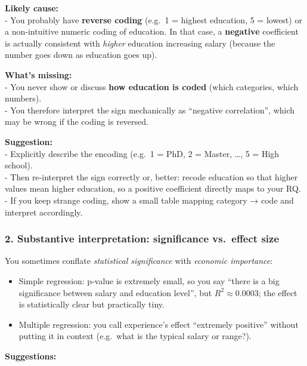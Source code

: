 \documentclass[
  letterpaper,
  DIV=11,
  numbers=noendperiod]{scrartcl}
\providecommand{\tightlist}{%
  \setlength{\itemsep}{0pt}\setlength{\parskip}{0pt}}
\begin{document}
\textbf{Likely cause:}\\
- You probably have \textbf{reverse coding} (e.g.~1 = highest education,
5 = lowest) or a non‑intuitive numeric coding of education. In that
case, a \textbf{negative} coefficient is actually consistent with
\emph{higher} education increasing salary (because the number goes down
as education goes up).

\textbf{What's missing:}\\
- You never show or discuss \textbf{how education is coded} (which
categories, which numbers).\\
- You therefore interpret the sign mechanically as ``negative
correlation'', which may be wrong if the coding is reversed.

\textbf{Suggestion:}\\
- Explicitly describe the encoding (e.g.~1 = PhD, 2 = Master, \ldots, 5
= High school).\\
- Then re-interpret the sign correctly or, better: recode education so
that higher values mean higher education, so a positive coefficient
directly maps to your RQ.\\
- If you keep strange coding, show a small table mapping category → code
and interpret accordingly.

\subsubsection{2. Substantive interpretation: significance vs.~effect
size}\label{substantive-interpretation-significance-vs.-effect-size}

You sometimes conflate \emph{statistical significance} with
\emph{economic importance}:

\begin{itemize}
\tightlist
\item
  Simple regression: p‑value is extremely small, so you say ``there is a
  big significance between salary and education level'', but
  \(R^2 \approx 0.0003\); the effect is statistically clear but
  practically tiny.\\
\item
  Multiple regression: you call experience's effect ``extremely
  positive'' without putting it in context (e.g.~what is the typical
  salary or range?).
\end{itemize}

\textbf{Suggestions:}
\end{document}
